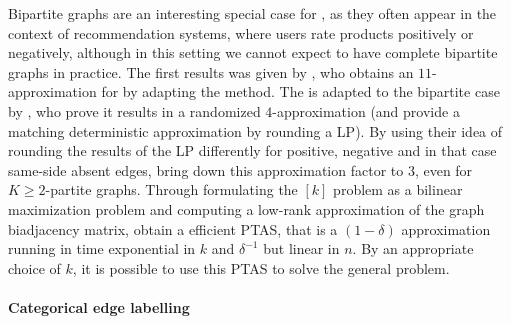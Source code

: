 Bipartite graphs are an interesting special case for \pcc{}, as they often appear in the context of
recommendation systems, where users rate products positively or negatively, although in this setting
we cannot expect to have complete bipartite graphs in practice. The first results was given by
\textcite{Amit04}, who obtains an $11$-approximation for \mind{} by adapting the \regionGrow{} method.
The \ccpivot{} is adapted to the bipartite case by
\textcite{Bipartite12}, who prove it results in a randomized $4$-approximation (and provide a matching
deterministic approximation by rounding a LP). By using their idea of rounding the results of the LP
differently for positive, negative and in that case same-side absent edges, \textcite{Chawla2014}
bring down this approximation factor to $3$, even for $K\geq 2$-partite graphs. Through formulating the
\maxa{}$[k]$ problem as a bilinear maximization problem and computing a low-rank approximation of
the graph biadjacency matrix, \textcite{Asteris2016} obtain a efficient PTAS, that is a $(1-\delta)$
approximation running in time exponential in $k$ and $\delta^{-1}$ but linear in $n$. By an
appropriate choice of $k$, it is possible to use this PTAS to solve the general \maxa{} problem.

\paragraph{Categorical edge labelling}

